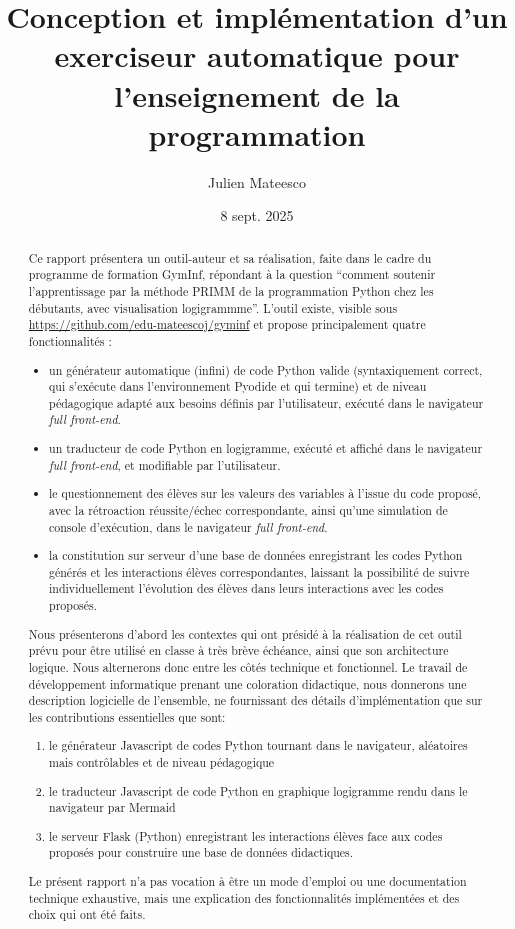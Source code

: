 \documentclass[11pt,a4paper]{article}
\title{\textbf{Conception et implémentation d'un exerciseur automatique pour l'enseignement de la programmation}}
\author{Julien Mateesco}
\date{8 sept. 2025}
\begin{document}
\maketitle

\begin{abstract}
Ce rapport présentera un outil-auteur et sa réalisation, faite dans le cadre du programme de formation GymInf, répondant à la question ``comment soutenir l'apprentissage par la méthode PRIMM de la programmation Python chez les débutants, avec visualisation logigrammme''. L'outil existe, visible sous \url{https://github.com/edu-mateescoj/gyminf} et propose principalement quatre fonctionnalités :
\begin{itemize}
    \item[\ding{51}] un générateur automatique (infini) de code Python valide (syntaxiquement correct, qui s'exécute dans l'environnement Pyodide et qui termine) et de niveau pédagogique adapté aux besoins définis par l'utilisateur, exécuté dans le navigateur \textit{full front-end}.
    \item[\ding{51}] un traducteur de code Python en logigramme, exécuté et affiché dans le navigateur \textit{full front-end}, et modifiable par l'utilisateur.
    \item[\ding{51}] le questionnement des élèves sur les valeurs des variables à l'issue du code proposé, avec la rétroaction réussite/échec correspondante, ainsi qu'une simulation de console d'exécution, dans le navigateur \textit{full front-end}.
    \item[\ding{51}] la constitution sur serveur d'une base de données enregistrant les codes Python générés et les interactions élèves correspondantes, laissant la possibilité de suivre individuellement l'évolution des élèves dans leurs interactions avec les codes proposés.
\end{itemize}   
Nous présenterons d'abord les contextes qui ont présidé à la réalisation de cet outil prévu pour être utilisé en classe à très brève échéance, ainsi que son architecture logique. Nous alternerons donc entre les côtés technique et fonctionnel. Le travail de développement informatique prenant une coloration didactique, nous donnerons une description logicielle de l'ensemble, ne fournissant des détails d'implémentation que sur les contributions essentielles que sont: \begin{enumerate}
    \item le générateur Javascript de codes Python tournant dans le navigateur, aléatoires mais contrôlables et de niveau pédagogique
    \item le traducteur Javascript de code Python en graphique logigramme rendu dans le navigateur par Mermaid
    \item le serveur Flask (Python) enregistrant les interactions élèves face aux codes proposés pour construire une base de données didactiques. 
\end{enumerate} 
Le présent rapport n'a pas vocation à être un mode d'emploi ou une documentation technique exhaustive, mais une explication des fonctionnalités implémentées et des choix qui ont été faits.
\end{abstract}
\end{document}
